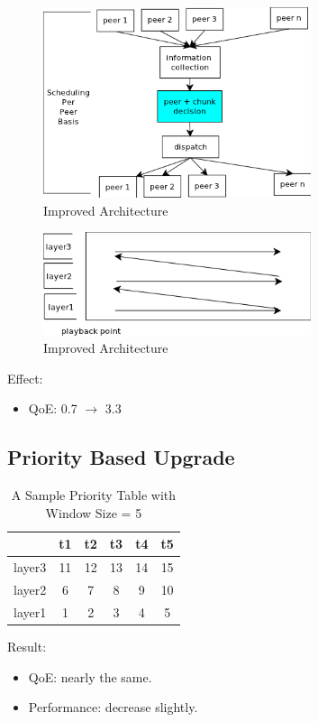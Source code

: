 \documentclass[11pt,a4paper]{article}
\begin{document}
\begin{figure}
	\includegraphics[width=0.7\textwidth]{../fig/arch_improved.png}
	\caption{Improved Architecture}
\end{figure}


\begin{figure}
	\includegraphics[width=0.7\textwidth]{../fig/pals_like.png}
	\caption{Improved Architecture}
\end{figure}
Effect:
\begin{itemize}
	\item QoE: 0.7 $\rightarrow$ 3.3
\end{itemize}


\subsection{Priority Based Upgrade}

\begin{table}
\caption{A Sample Priority Table with Window Size = 5}
	\begin{tabular}{|c|ccccc|}
	\hline
	 & t1 & t2 & t3 & t4 & t5 \\
	 \hline
	layer3 & 11 & 12 & 13 & 14 & 15 \\
	layer2 & 6 & 7 & 8 & 9 & 10 \\
	layer1 & 1 & 2 & 3 & 4 & 5 \\
	\hline
	\end{tabular}
\end{table}

Result:
\begin{itemize}
	\item QoE: nearly the same. 
	\item Performance: decrease slightly. 
\end{itemize}
\end{document}
